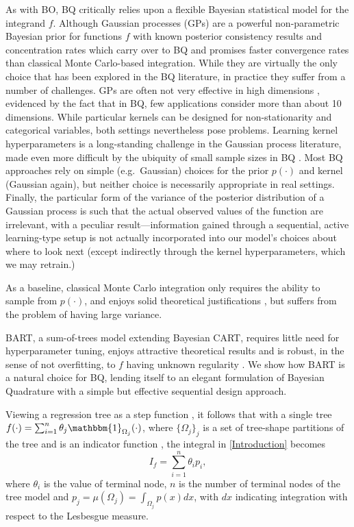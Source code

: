 As with BO, BQ critically relies upon a flexible Bayesian statistical model for the integrand $f$. Although Gaussian processes (GPs) are a powerful non-parametric Bayesian prior for functions $f$ with known posterior consistency results and concentration rates \cite{10.2307/25464673} which carry over to BQ \cite{briol2015frank} and promises faster convergence rates than classical Monte Carlo-based integration. While they are virtually the only choice that has been explored in the BQ literature, in practice they suffer from a number of challenges. GPs are often not very effective in high dimensions \cite{7352306}, evidenced by the fact that in BQ, few applications consider more than about 10 dimensions. While particular kernels can be designed for non-stationarity and categorical variables, both settings nevertheless pose problems. %
Learning kernel hyperparameters is a long-standing challenge in the Gaussian process literature, made even more difficult by the ubiquity of small sample sizes in BQ \cite{Rasmussen:2002:BMC:2968618.2968681}.  Most BQ approaches rely on simple (e.g.~Gaussian) choices for the prior $p(\cdot)$ and kernel (Gaussian again), but neither choice is necessarily appropriate in real settings. Finally, the particular form of the variance of the posterior distribution of a Gaussian process is such that the actual observed values of the function are irrelevant, with a peculiar result---information gained through a sequential, active learning-type setup is not actually incorporated into our model's choices about where to look next (except indirectly through the kernel hyperparameters, which we may retrain.)

As a baseline, classical Monte Carlo integration \cite{Press:2007:NRE:1403886} only requires the ability to sample from $p(\cdot)$, and enjoys solid theoretical justifications \cite{Durrett:2010:PTE:1869916}, but suffers from the problem of having large variance.

BART, a sum-of-trees model extending Bayesian CART, requires little need for hyperparameter tuning, enjoys attractive theoretical results \cite{rockova2017posterior} and is robust, in the sense of not overfitting, to $f$ having unknown regularity \cite{rockova2019theory}. We show how BART is a natural choice for BQ, lending itself to an elegant formulation of Bayesian Quadrature with a simple but effective sequential design approach. 

Viewing a regression tree as a step function , it follows that with a single tree $f(\cdot) = \sum_{i=1}^{n}\theta_j \mathbbm{1}_{\Omega_j}(\cdot)$, where $\{\Omega_j\}_j$ is a set of tree-shape partitions of the tree and  is an indicator function \cite{rockova2019theory}, the integral in \eqref{Introduction} becomes 
\begin{equation}
	I_f = \sum_{i=1}^{n} \theta_i p_i,
\label{eq:single tree approximation}
\end{equation}
where $\theta_i$ is the value of terminal node, $n$ is the number of terminal nodes of the tree model and $p_j = \mu(\Omega_j) = \int_{\Omega_j} p(x) dx$, with $dx$ indicating integration with respect to the Lesbesgue measure.

